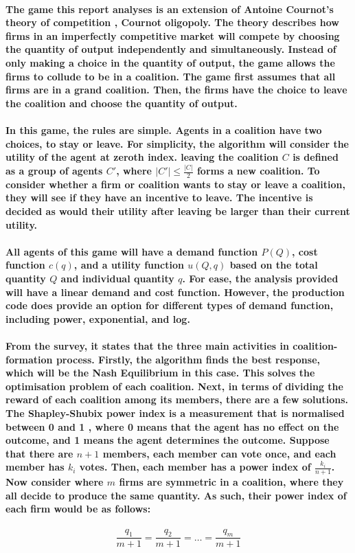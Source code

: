 \documentclass[11pt]{report}
\begin{document}
\paragraph{The game this report analyses is an extension of Antoine Cournot's theory of competition \cite{cournot1838} , Cournot oligopoly. The theory describes how firms in an imperfectly competitive market will compete by choosing the quantity of output independently and simultaneously. Instead of only making a choice in the quantity of output, the game allows the firms to collude to be in a coalition. The game first assumes that all firms are in a grand coalition. Then, the firms have the choice to leave the coalition and choose the quantity of output.}

\paragraph{In this game, the rules are simple. Agents in a coalition have two choices, to stay or leave. For simplicity, the algorithm will consider the utility of the agent at zeroth index.  leaving the coalition $C$ is defined as a group of agents $C'$, where $|C'| \leq \frac{|C|}2$ forms a new coalition. To consider whether a firm or coalition wants to stay or leave a coalition, they will see if they have an incentive to leave. The incentive is decided as would their utility after leaving be larger than their current utility. }
\paragraph{All agents of this game will have a demand function $P(Q)$, cost function $c(q)$, and a utility function $u(Q, q)$ based on the total quantity $Q$ and individual quantity $q$. For ease, the analysis provided will have a linear demand and cost function. However, the production code does provide an option for different types of demand function, including power, exponential, and log.}


\paragraph{From the survey, it states that the three main activities in coalition-formation process. Firstly, the algorithm finds the best response, which will be the Nash Equilibrium in this case. This solves the optimisation problem of each coalition. Next, in terms of dividing the reward of each coalition among its members, there are a few solutions. The Shapley-Shubix power index is a measurement that is normalised between 0 and 1 \cite{shapley1954power} , where 0 means that the agent has no effect on the outcome, and 1 means the agent determines the outcome. Suppose that there are $n+1$ members, each member can vote once, and each member has $k_i$ votes. Then, each member has a power index of $\frac{k_i}{n+1}$. Now consider where $m$ firms are symmetric in a coalition, where they all decide to produce the same quantity. As such, their power index of each firm would be as follows:  }
\[\frac{q_1}{m+1}=\frac{q_2}{m+1}=\dots=\frac{q_m}{m+1}\]
\end{document}
